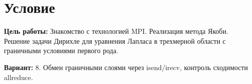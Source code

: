 \section{Условие}
\textbf{Цель работы:} Знакомство с технологией MPI. Реализация метода Якоби. Решение задачи Дирихле для уравнения Лапласа в трехмерной области с граничными условиями первого рода.

\textbf{Вариант:} 8. Обмен граничными слоями через isend/irecv, контроль сходимости allreduce.
